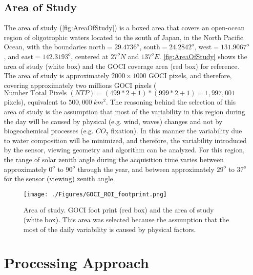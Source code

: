 \documentclass[onecolumn,3p,letterpaper,11pt]{elsarticle}
\begin{document}
\subsection{Area of Study}

The area of study (\autoref{fig:AreaOfStudy}) is a boxed area that covers an open-ocean region of oligotrophic waters located to the south of Japan, in the North Pacific Ocean, with the boundaries north$=29.4736^o$, south$=24.2842^o$, west$=131.9067^o$, and east$=142.3193^o$, centered at $27^oN$ and $137^oE$. \autoref{fig:AreaOfStudy} shows the area of study (white box) and the GOCI coverage area (red box) for reference. The area of study is approximately $2000\times 1000$ GOCI pixels, and therefore, covering approximately two millions GOCI pixels ($\text{Number Total Pixels } (NTP) = (499*2+1)*(999*2+1) =  1,997,001$ pixels), equivalent to $500,000\ km^2$. The reasoning behind the selection of this area of study is the assumption that most of the variability in this region during the day will be caused by physical (e.g. wind, waves) changes and not by biogeochemical processes (e.g. $CO_2$ fixation). In this manner the variability due to water composition will be minimized, and therefore, the variability introduced by the sensor, viewing geometry and algorithm can be analyzed. For this region, the range of solar zenith angle during the acquisition time  varies between approximately $0^o$ to $90^o$ through the year, and between approximately $29^o$ to $37^o$ for the sensor (viewing) zenith angle.

\begin{figure}[ht]
	\centering
    \texttt{[image: ./Figures/GOCI\_ROI\_footprint.png]}
	\caption{Area of study. GOCI foot print (red box) and the area of study (white box). This area was selected because the assumption that the most of the daily variability is caused by physical factors.}
	\label{fig:AreaOfStudy}
\end{figure}
\section{Processing Approach}
\label{sec:processing}
\end{document}
